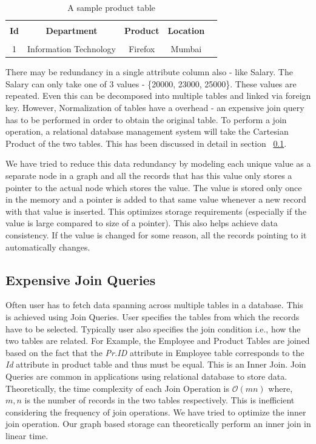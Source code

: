 \documentclass[12pt, oneside]{book}
\begin{document}
\begin{table}
    \centering
    \begin{tabular}{| c | c | c | c | @{}m{0pt}@{}}
    \hline
    \multicolumn{1}{|c|}{} & \multicolumn{1}{c|}{} & \multicolumn{1}{c|}{} & \multicolumn{1}{c|}{} &  \\
    \multicolumn{1}{|c|}{\textbf{Id}} & \multicolumn{1}{c|}{\textbf{Department}} & \multicolumn{1}{c|}{\textbf{Product}} & \multicolumn{1}{c|}{\textbf{Location}} & \\
    \multicolumn{1}{|c|}{} & \multicolumn{1}{c|}{} & \multicolumn{1}{c|}{} & \multicolumn{1}{c|}{} &  \\
    \hline
    1 & Information Technology & Firefox & Mumbai & \\ [1ex] \hline
    \end{tabular}
    \caption{A sample product table}
    \label{tab:product}
\end{table}
There may be redundancy in a single attribute column also - like Salary. The Salary can only take one of 3 values - \{20000, 23000, 25000\}. These values are repeated. Even this can be decomposed into multiple tables and linked via foreign key. However, Normalization of tables have a overhead - an expensive join query has to be performed in order to obtain the original table. To perform a join operation, a relational database management system will take the Cartesian Product of the two tables. This has been discussed in detail in section ~\ref{sec:join}. \par
We have tried to reduce this data redundancy by modeling each unique value as a separate node in a graph and all the records that has this value only stores a pointer to the actual node which stores the value. The value is stored only once in the memory and a pointer is added to that same value whenever a new record with that value is inserted. This optimizes storage requirements (especially if the value is large compared to size of a pointer). This also helps achieve data consistency. If the value is changed for some reason, all the records pointing to it automatically changes.
\subsection{Expensive Join Queries}
\label{sec:join}
Often user has to fetch data spanning across multiple tables in a database. This is achieved using Join Queries. User specifies the tables from which the records have to be selected. Typically user also specifies the join condition i.e., how the two tables are related. For Example, the Employee and Product Tables are joined based on the fact that the \emph{Pr.ID} attribute in Employee table corresponds to the \emph{Id} attribute in product table and thus must be equal. This is an Inner Join. Join Queries are common in applications using relational database to store data. Theoretically, the time complexity of each Join Operation is $\mathcal{O}\left( mn \right)$ where, $m, n$ is the number of records in the two tables respectively. This is inefficient considering the frequency of join operations. We have tried to optimize the inner join operation. Our graph based storage can theoretically perform an inner join in linear time. 
\end{document}
